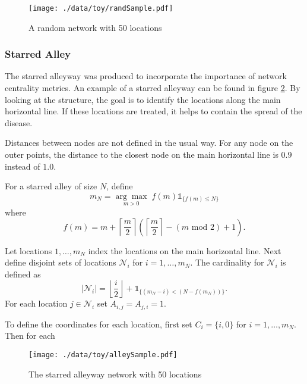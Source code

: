 \documentclass[11pt]{article}
\begin{document}
\begin{figure}[htb]
\centering
\texttt{[image: ./data/toy/randSample.pdf]}
\caption{\label{fig:rand25}A random network with 50 locations}
\end{figure}



\subsubsection{Starred Alley}
\label{sec-3-1-2}

The starred alleyway was produced to incorporate the importance of
network centrality metrics.  An example of a starred alleyway can be
found in figure \ref{fig:alley25}.  By looking at the structure, the goal is
to identify the locations along the main horizontal line.  If these
locations are treated, it helps to contain the spread of the disease.

Distances between nodes are not defined in the usual way.  For any
node on the outer points, the distance to the closest node on the main
horizontal line is $0.9$ instead of $1.0$.

For a starred alley of size $N$, define
\begin{equation*}
  m_N = \underset{m > 0}{\arg\max} \; f(m) \mathds{1}_{\lbrace f(m) \le N
    \rbrace }
\end{equation*}
where
\begin{equation*}
  f(m) = m + \left\lceil \frac{m}{2}
  \right\rceil 
  \left(\left\lceil \frac{m}{2} \right\rceil
    - (m \text{ mod } 2) + 1 \right).
\end{equation*}

Let locations $1,\ldots,m_N$ index the locations on the main
horizontal line.  Next define disjoint sets of locations
$\mathcal{N}_i$ for $i = 1,\ldots,m_N$.  The cardinality for
$\mathcal{N}_i$ is defined as
\begin{equation*}
  | \mathcal{N}_i | = \left\lfloor \frac{i}{2} \right\rfloor +
  \mathds{1}_{\lbrace(m_N - i) < (N - f(m_N))\rbrace}.
\end{equation*}
For each location $j \in \mathcal{N}_i$ set $A_{i,j} = A_{j,i} = 1$.

To define the coordinates for each location, first set $C_{i} =
\lbrace i,0 \rbrace$ for $i = 1,\ldots,m_N$.  Then for each 


\begin{figure}[htb]
\centering
\texttt{[image: ./data/toy/alleySample.pdf]}
\caption{\label{fig:alley25}The starred alleyway network with 50 locations}
\end{figure}
\end{document}
